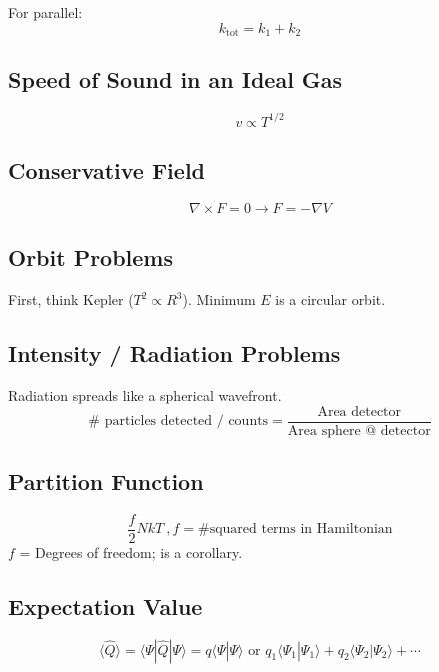 \documentclass[10pt,letter]{article}
\begin{document}
For parallel: 
\begin{equation}
    k_{\textrm{tot}} = k_1 + k_2
\end{equation}

\subsection{Speed of Sound in an Ideal Gas}
\begin{equation}
 v \propto T^{1/2} 
\end{equation}

\subsection{Conservative Field}
\begin{equation}
 \nabla \times F = 0 \rightarrow F = -\nabla V
\end{equation}

\subsection{Orbit Problems}
First, think Kepler ($T^2 \propto R^3$). Minimum $E$ is a circular orbit.

\subsection{Intensity / Radiation Problems}
Radiation spreads like a spherical wavefront. 
\begin{equation}
 \# \textrm{ particles detected / counts} = \frac{\textrm{Area detector}}{\textrm{Area sphere @ detector}}
\end{equation}

\subsection{Partition Function}
\begin{equation}
 \frac{f}{2}NkT~,f = \textrm{\# squared terms in Hamiltonian}
\end{equation}
$f$ = Degrees of freedom; is a corollary.

\subsection{Expectation Value}
\begin{equation}
  \langle \hat{Q} \rangle = \langle \Psi | \hat{Q} | \Psi \rangle = q \langle \Psi | \Psi \rangle \textrm{ or } q_1 \langle \Psi_1 | \Psi_1 \rangle + q_2 \langle \Psi_2 | \Psi_2 \rangle + \cdots
\end{equation}
\end{document}
